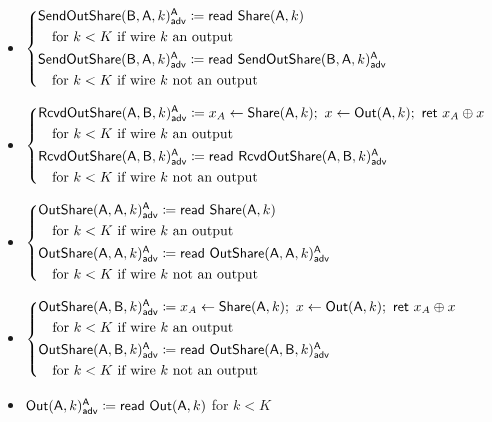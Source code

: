 \begin{itemize}
\item {\color{blue} $\begin{cases*} \LeakSendOutShare(\B,\A,k)^\A_\adv \coloneqq \read{\Share(\A,k)} \\ \hspace{10pt} \text{for $k < K$ if wire $k$ an output} \\ \LeakSendOutShare(\B,\A,k)^\A_\adv \coloneqq \read{\LeakSendOutShare(\B,\A,k)^\A_\adv} \\ \hspace{10pt} \text{for $k < K$ if wire $k$ not an output} \end{cases*}$}
\item {\color{blue} $\begin{cases*} \LeakRcvdOutShare(\A,\B,k)^\A_\adv \coloneqq x_A \leftarrow \Share(\A,k); \ x \leftarrow \Out(\A,k); \ \ret{x_A \oplus x} \\ \hspace{10pt} \text{for $k < K$ if wire $k$ an output} \\ \LeakRcvdOutShare(\A,\B,k)^\A_\adv \coloneqq \read{\LeakRcvdOutShare(\A,\B,k)^\A_\adv} \\ \hspace{10pt} \text{for $k < K$ if wire $k$ not an output} \end{cases*}$}
\item {\color{blue} $\begin{cases*} \LeakOutShare(\A,\A,k)^\A_\adv \coloneqq \read{\Share(\A,k)} \\ \hspace{10pt} \text{for $k < K$ if wire $k$ an output} \\ \LeakOutShare(\A,\A,k)^\A_\adv \coloneqq \read{\LeakOutShare(\A,\A,k)^\A_\adv} \\ \hspace{10pt} \text{for $k < K$ if wire $k$ not an output} \end{cases*}$}
\item {\color{blue} $\begin{cases*} \LeakOutShare(\A,\B,k)^\A_\adv \coloneqq x_A \leftarrow \Share(\A,k); \ x \leftarrow \Out(\A,k); \ \ret{x_A \oplus x} \\ \hspace{10pt} \text{for $k < K$ if wire $k$ an output} \\ \LeakOutShare(\A,\B,k)^\A_\adv \coloneqq \read{\LeakOutShare(\A,\B,k)^\A_\adv} \\ \hspace{10pt} \text{for $k < K$ if wire $k$ not an output} \end{cases*}$}
\item {\color{blue} $\mathsf{Out}(\mathsf{A},k)^{\mathsf{A}}_{\mathsf{adv}} \coloneqq \mathsf{read} \ \mathsf{Out}(\mathsf{A},k)$ for $k < K$}
\end{itemize}

